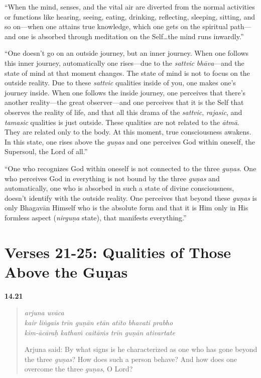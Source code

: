 \enquote{When the mind, senses, and the vital air are diverted from the normal activities or functions like hearing, seeing, eating, drinking, reflecting, sleeping, sitting, and so on---when one attains true knowledge, which one gets on the spiritual path---and one is absorbed through meditation on the Self\ldots the mind runs inwardly.}

\enquote{One doesn’t go on an outside journey, but an inner journey. When one follows this inner journey, automatically one rises---due to the \textit{sattvic} \textit{bhāva}---and the state of mind at that moment changes. The state of mind is not to focus on the outside reality. Due to these \textit{sattvic} qualities inside of you, one makes one’s journey inside. When one follows the inside journey, one perceives that there’s another reality---the great observer---and one perceives that it is the Self that observes the reality of life, and that all this drama of the \textit{sattvic}, \textit{rajasic}, and \textit{tamasic} qualities is just outside. These qualities are not related to the \textit{ātmā}. They are related only to the body. At this moment, true consciousness awakens. In this state, one rises above the \textit{guṇas} and one perceives God within oneself, the Supersoul, the Lord of all.}

\enquote{One who recognizes God within oneself is not connected to the three \textit{guṇas}. One who perceives God in everything is not bound by the three \textit{guṇas} and automatically, one who is absorbed in such a state of divine consciousness, doesn’t identify with the outside reality. One perceives that beyond these \textit{guṇas} is only Bhagavān Himself who is the absolute form and that it is Him only in His formless aspect (\textit{nirguṇa} state), that manifests everything.}

\section{Verses 21-25: Qualities of Those Above the Guṇas}\label{sec-verses-21-25-qualities-of-those-above-the-gunas}


\par\noindent\textbf{14.21}\par
\begin{verse}
\textit{arjuna uvāca} \\
\textit{kair liṅgais trīn guṇān etān atīto bhavati prabho} \\
\textit{kim-ācāraḥ kathaṁ caitāṁs trīn guṇān ativartate}

\noindent Arjuna said: By what signs is he characterized as one who has gone beyond the three \textit{guṇas}? How does such a person behave? And how does one overcome the three \textit{guṇas}, O Lord?
\end{verse}
\par



